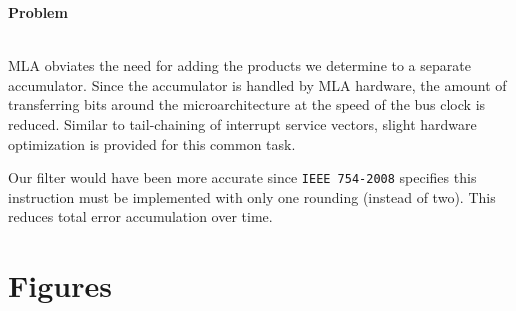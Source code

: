 \documentclass[12pt]{article}
\newenvironment{Ex}{\textbf{Problem}\vspace{.25em}\\}{}
\newcommand{\hbr}{\hfill\vspace{.25em}\\}
\begin{document}
\begin{enumerate}[1)]
\begin{Ex}
    \begin{solution} \hbr
      MLA obviates the need for adding the products we determine to a
      separate accumulator. Since the accumulator is handled by MLA
      hardware, the amount of transferring bits around the
      microarchitecture at the speed of the bus clock is reduced. Similar
      to tail-chaining of interrupt service vectors, slight hardware
      optimization is provided for this common task.

      Our filter would have been more accurate since \verb|IEEE 754-2008|
      specifies this instruction must be implemented with only one
      rounding (instead of two). This reduces total error accumulation
      over time.
    \end{solution}
  \end{Ex}
\end{enumerate}

\newpage
\section{Figures}
\end{document}
